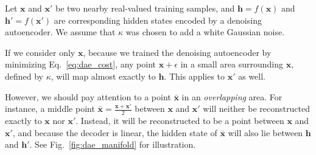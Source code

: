 \documentclass[dissertation,nocontribution,draft*]{aaltoseries}
\newcommand{\vect}[1]{\mathbf{#1}}
\newcommand{\vh}[0]{\vect{h}}
\newcommand{\vx}[0]{\vect{x}}
\begin{document}
Let $\vx$ and $\vx'$ be two nearby real-valued training
samples, and $\vh=f(\vx)$ and $\vh'=f(\vx')$ are
corresponding hidden states encoded by a denoising
autoencoder. We assume that $\kappa$ was chosen to add a
white Gaussian noise.

If we consider only $\vx$, because we trained the denoising
autoencoder by minimizing Eq.~\eqref{eq:dae_cost}, any point
$\vx + \epsilon$ in a small area surrounding $\vx$, defined
by $\kappa$, will map almost exactly to $\vh$. This applies
to $\vx'$ as well. 

However, we should pay attention to a point $\bar{\vx}$ in
an \textit{overlapping} area. For instance, a middle point
$\bar{\vx} = \frac{\vx + \vx'}{2}$ between $\vx$ and $\vx'$
will neither be reconstructed exactly to $\vx$ nor $\vx'$.
Instead, it will be reconstructed to be a point between
$\vx$ and $\vx'$, and because the decoder is linear, the
hidden state of $\bar{\vx}$ will also lie between $\vh$ and
$\vh'$. See Fig.~\ref{fig:dae_manifold} for illustration.
\end{document}
